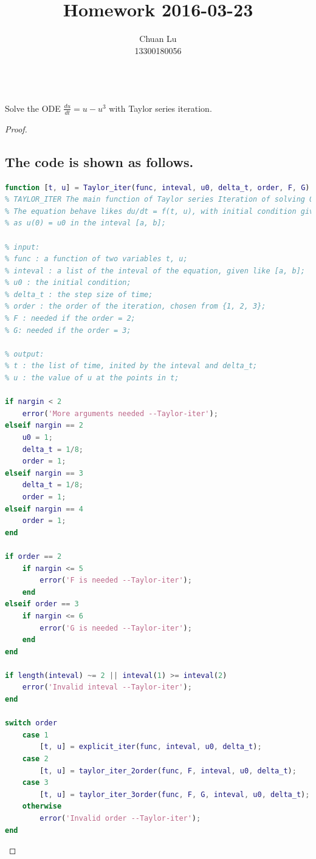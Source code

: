 \documentclass{article}
\newenvironment{problem}[2][Problem]{\begin{trivlist}
\item[\hskip \labelsep {\bfseries #1}\hskip \labelsep {\bfseries #2.}]}{\end{trivlist}}
\begin{document}
\title{Homework 2016-03-23}
\author{Chuan Lu\\
13300180056}

\maketitle

\begin{problem}{1}
\text{ }\\
Solve the ODE $\frac{du}{dt} = u - u^{3}$ with Taylor series iteration.
\end{problem}

\begin{proof}
\subsection{The code is shown as follows.} 
\begin{lstlisting}[language={MATLAB}]
function [t, u] = Taylor_iter(func, inteval, u0, delta_t, order, F, G)
% TAYLOR_ITER The main function of Taylor series Iteration of solving ODEs
% The equation behave likes du/dt = f(t, u), with initial condition given 
% as u(0) = u0 in the inteval [a, b];

% input:
% func : a function of two variables t, u;
% inteval : a list of the inteval of the equation, given like [a, b];
% u0 : the initial condition;
% delta_t : the step size of time;
% order : the order of the iteration, chosen from {1, 2, 3};
% F : needed if the order = 2; 
% G: needed if the order = 3;

% output:
% t : the list of time, inited by the inteval and delta_t;
% u : the value of u at the points in t;

if nargin < 2
    error('More arguments needed --Taylor-iter');
elseif nargin == 2
    u0 = 1;
    delta_t = 1/8;
    order = 1;
elseif nargin == 3
    delta_t = 1/8;
    order = 1;
elseif nargin == 4
    order = 1;
end

if order == 2
    if nargin <= 5
        error('F is needed --Taylor-iter');
    end
elseif order == 3
    if nargin <= 6
        error('G is needed --Taylor-iter');
    end
end

if length(inteval) ~= 2 || inteval(1) >= inteval(2)
    error('Invalid inteval --Taylor-iter');
end

switch order
    case 1
        [t, u] = explicit_iter(func, inteval, u0, delta_t);
    case 2
        [t, u] = taylor_iter_2order(func, F, inteval, u0, delta_t);
    case 3
        [t, u] = taylor_iter_3order(func, F, G, inteval, u0, delta_t);
    otherwise
        error('Invalid order --Taylor-iter');
end
\end{lstlisting}


\end{proof}
\end{document}
